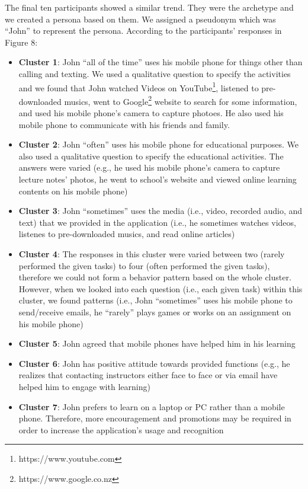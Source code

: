 \documentclass[a4paper,twoside]{article}
\begin{document}
The final ten participants showed a similar trend. They were the archetype and we created a persona based on them. We assigned a pseudonym which was ``John'' to represent the persona. According to the participants' responses in Figure 8: 
\begin{itemize}
\item{\textbf{Cluster 1}: John ``all of the time'' uses his mobile phone for things other than calling and texting. We used a qualitative question to specify the activities and we found that John watched Videos on YouTube\footnote{https://www.youtube.com}, listened to pre-downloaded musics, went to Google\footnote{https://www.google.co.nz} website to search for some information, and used his mobile phone's camera to capture photoes. He also used his mobile phone to communicate with his friends and family.}
\item{\textbf{Cluster 2}: John ``often'' uses his mobile phone for educational purposes.  We also used a qualitative question to specify the educational activities. The answers were varied (e.g., he used his mobile phone's camera to capture lecture notes' photos, he went to school's website and viewed online learning contents on his mobile phone)}
\item{\textbf{Cluster 3}: John ``sometimes'' uses the media (i.e., video, recorded audio, and text) that we provided in the application (i.e., he sometimes watches videos, listenes to pre-downloaded musics, and read online articles)}
\item{\textbf{Cluster 4}: The responses in this cluster were varied between two (rarely performed the given tasks) to four (often performed the given tasks), therefore we could not form a behavior pattern based on the whole cluster. However, when we looked into each question (i.e., each given task) within this cluster, we found patterns (i.e., John ``sometimes'' uses his mobile phone to send/receive emails, he ``rarely'' plays games or works on an assignment on his mobile phone)}
\item{\textbf{Cluster 5}: John agreed that mobile phones have helped him in his learning}
\item{\textbf{Cluster 6}: John has positive attitude towards provided functions (e.g., he realizes that contacting instructors either face to face or via email have helped him to engage with learning)}
\item{\textbf{Cluster 7}: John prefers to learn on a laptop or PC rather than a mobile phone. Therefore, more encouragement and promotions may be required in order to increase the application's usage and recognition}
\end{itemize}
\end{document}
